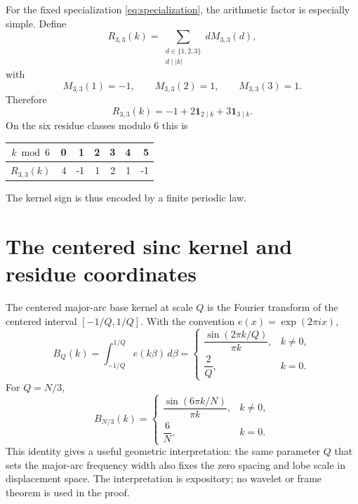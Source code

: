 \documentclass[11pt]{article}
\theoremstyle{definition}
\newcommand{\abs}[1]{\left|#1\right|}
\begin{document}
For the fixed specialization \eqref{eq:specialization}, the arithmetic factor is especially simple. Define
\[
R_{3,3}(k)=
\sum_{\substack{d\in\{1,2,3\}\\d\mid\abs{k}}}dM_{3,3}(d),
\]
with
\[
M_{3,3}(1)=-1,\qquad M_{3,3}(2)=1,\qquad M_{3,3}(3)=1.
\]
Therefore
\begin{equation}\label{eq:carrier}
\boxed{
R_{3,3}(k)=-1+2\mathbf1_{2\mid k}+3\mathbf1_{3\mid k}.
}
\end{equation}
On the six residue classes modulo $6$ this is
\begin{center}
\begin{tabular}{c|rrrrrr}
$k\bmod6$&0&1&2&3&4&5\\\hline
$R_{3,3}(k)$&4&-1&1&2&1&-1
\end{tabular}
\end{center}
The kernel sign is thus encoded by a finite periodic law.

\section{The centered sinc kernel and residue coordinates}\label{sec:residue}

The centered major-arc base kernel at scale $Q$ is the Fourier transform of the centered interval $[-1/Q,1/Q]$. With the convention $e(x)=\exp(2\pi i x)$,
\begin{equation}\label{eq:sinc-general}
B_Q(k)
=\int_{-1/Q}^{1/Q}e(k\beta)\,d\beta
=\begin{cases}
\dfrac{\sin(2\pi k/Q)}{\pi k},&k\ne0,\\[2mm]
\dfrac2Q,&k=0.
\end{cases}
\end{equation}
For $Q=N/3$,
\begin{equation}\label{eq:sinc}
B_{N/3}(k)=
\begin{cases}
\dfrac{\sin(6\pi k/N)}{\pi k},&k\ne0,\\[2mm]
\dfrac6N,&k=0.
\end{cases}
\end{equation}
This identity gives a useful geometric interpretation: the same parameter $Q$ that sets the major-arc frequency width also fixes the zero spacing and lobe scale in displacement space. The interpretation is expository; no wavelet or frame theorem is used in the proof.
\end{document}
